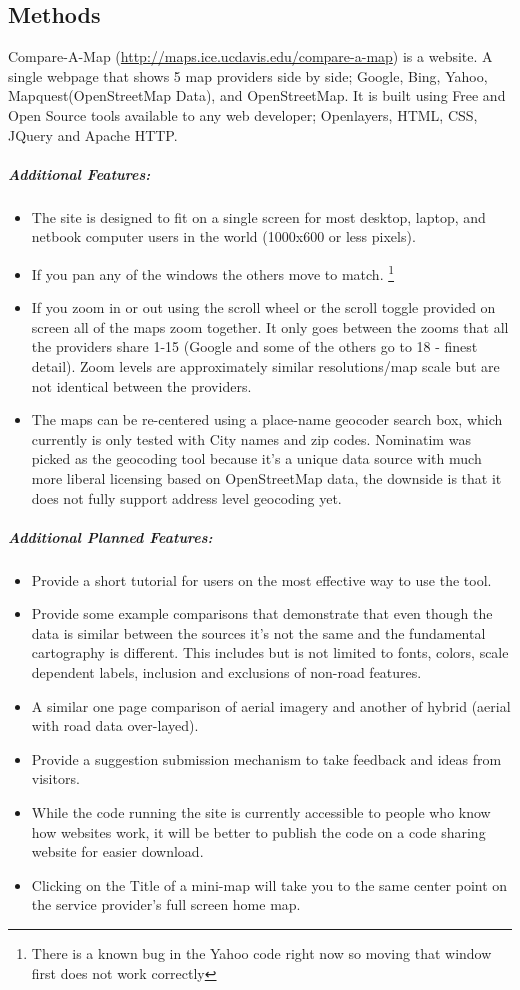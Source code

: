 \documentclass[12pt,letterpaper]{article}
\begin{document}
\subsection{Methods}
Compare-A-Map (\url{http://maps.ice.ucdavis.edu/compare-a-map}) is a website. A single webpage that shows 5 map providers side by side; Google, Bing, Yahoo, Mapquest(OpenStreetMap Data), and OpenStreetMap. It is built using Free and Open Source tools available to any web developer; Openlayers, HTML, CSS, JQuery and Apache HTTP.

\subparagraph{Additional Features:}
\begin{itemize}
\item The site is designed to fit on a single screen for most desktop, laptop, and netbook computer users in the world (1000x600 or less pixels).
\item If you pan any of the windows the others move to match. \footnote{There is a known bug in the Yahoo code right now so moving that window first does not work correctly}
\item If you zoom in or out using the scroll wheel or the scroll toggle provided on screen all of the maps zoom together. It only goes between the zooms that all the providers share 1-15 (Google and some of the others go to 18 - finest detail). Zoom levels are approximately similar resolutions/map scale but are not identical between the providers.
\item The maps can be re-centered using a place-name geocoder search box, which currently is only tested with City names and zip codes. Nominatim \parencite{Mapquest2012} was picked as the geocoding tool because it's a unique data source with much more liberal licensing based on OpenStreetMap data, the downside is that it does not fully support address level geocoding yet. 
\end{itemize}


\subparagraph{Additional Planned Features:}
\begin{itemize}
\item Provide a short tutorial for users on the most effective way to use the tool.
\item Provide some example comparisons that demonstrate that even though the data is similar between the sources it's not the same and the fundamental cartography is different. This includes but is not limited to fonts, colors, scale dependent labels, inclusion and exclusions of non-road features.
\item A similar one page comparison of aerial imagery and another of hybrid (aerial with road data over-layed).
\item Provide a suggestion submission mechanism to take feedback and ideas from visitors.
\item While the code running the site is currently accessible to people who know how websites work, it will be better to publish the code on a code sharing website for easier download.
\item Clicking on the Title of a mini-map will take you to the same center point on the service provider's full screen home map.
\end{itemize}
\end{document}
